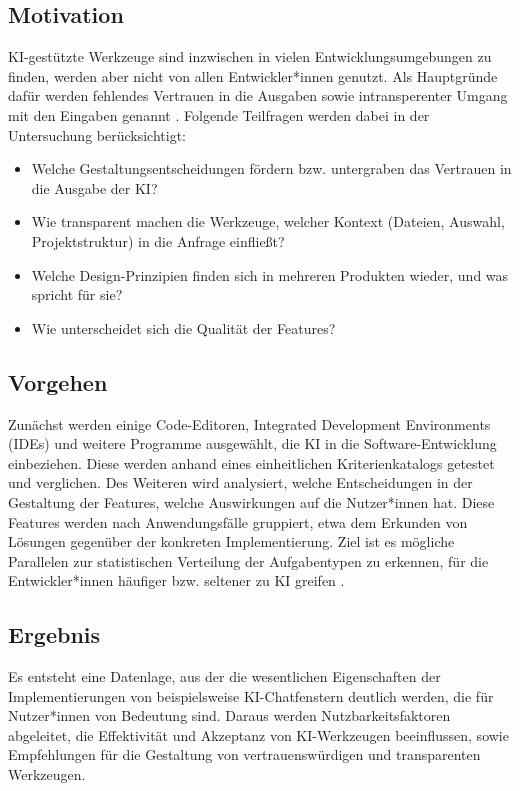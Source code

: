 \documentclass[ngerman]{article}
\begin{document}
    \subsection{Motivation}
    KI-gestützte Werkzeuge sind inzwischen in vielen Entwicklungsumgebungen zu finden, werden aber nicht von allen Entwickler*innen genutzt. Als Hauptgründe dafür werden fehlendes Vertrauen in die Ausgaben sowie intransperenter Umgang mit den Eingaben genannt \cite{Sergeyuk_2025}. Folgende Teilfragen werden dabei in der Untersuchung berücksichtigt:
    \begin{itemize}
      \item Welche Gestaltungsentscheidungen fördern bzw. untergraben das Vertrauen in die Ausgabe der KI?
      \item Wie transparent machen die Werkzeuge, welcher Kontext (Dateien, Auswahl, Projektstruktur) in die Anfrage einfließt?
      \item Welche Design-Prinzipien finden sich in mehreren Produkten wieder, und was spricht für sie?
      \item Wie unterscheidet sich die Qualität der Features?
    \end{itemize}

    \subsection{Vorgehen}
    Zunächst werden einige Code-Editoren, Integrated Development Environments (IDEs) und weitere Programme ausgewählt, die KI in die Software-Entwicklung einbeziehen. Diese werden anhand eines einheitlichen Kriterienkatalogs getestet und verglichen. Des Weiteren wird analysiert, welche Entscheidungen in der Gestaltung der Features, welche Auswirkungen auf die Nutzer*innen hat. Diese Features werden nach Anwendungsfälle gruppiert, etwa dem Erkunden von Lösungen gegenüber der konkreten Implementierung. Ziel ist es mögliche Parallelen zur statistischen Verteilung der Aufgabentypen zu erkennen, für die Entwickler*innen häufiger bzw. seltener zu KI greifen \cite{barke2022groundedcopilotprogrammersinteract}.

    \subsection{Ergebnis}
    Es entsteht eine Datenlage, aus der die wesentlichen Eigenschaften der Implementierungen von beispielsweise KI-Chatfenstern deutlich werden, die für Nutzer*innen von Bedeutung sind. Daraus werden Nutzbarkeitsfaktoren abgeleitet, die Effektivität und Akzeptanz von KI-Werkzeugen beeinflussen, sowie Empfehlungen für die Gestaltung von vertrauenswürdigen und transparenten Werkzeugen.


\end{document}
